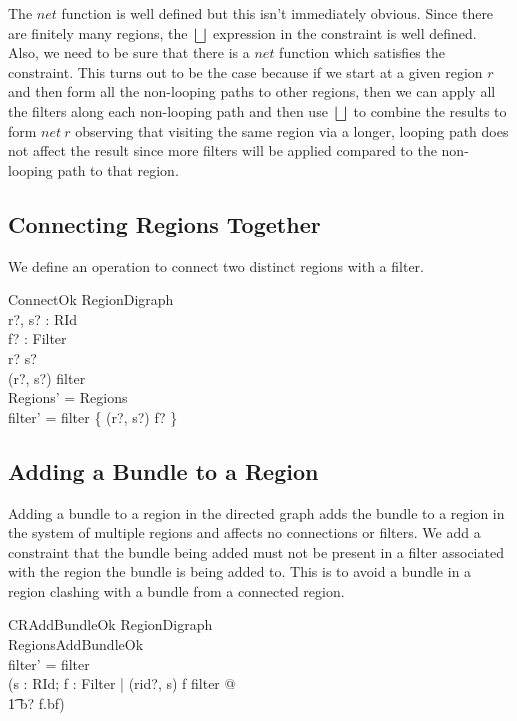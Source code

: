 \documentclass[a4paper,9pt]{article}
\begin{document}
The $net$ function is well defined but this isn't immediately obvious.
Since there are finitely many regions, the $\bigsqcup$ expression in the constraint is well defined.
Also, we need to be sure that there is a $net$ function which satisfies the constraint.
This turns out to be the case because if we start at a given region $r$ and then form all the non-looping
paths to other regions, then we can apply all the filters along each non-looping path and then
use $\bigsqcup$ to combine the results to form $net~r$ observing that visiting the same region via
a longer, looping path does not affect the result since more filters will
be applied compared to the non-looping path to that region.

\subsection{Connecting Regions Together}

We define an operation to connect two distinct regions with a filter.
\begin{schema}{ConnectOk}
  \Delta RegionDigraph \\
  r?, s? : RId \\
  f? : Filter \\
\where
  r? \neq s? \\
  (r?, s?) \notin \dom filter \\
  \theta Regions' = \theta Regions \\
  filter' = filter \cup \{ (r?, s?) \mapsto f? \} \\
\end{schema}

\subsection{Adding a Bundle to a Region}

Adding a bundle to a region in the directed graph adds the bundle to a region in the
system of multiple regions and affects no connections or filters.
We add a constraint that the bundle being added must not 
be present in a filter associated with the region the bundle is being added to.
This is to avoid a bundle in a region clashing with a bundle from a connected region.
\begin{schema}{CRAddBundleOk}
  \Delta RegionDigraph \\
  RegionsAddBundleOk \\
\where
  filter' = filter \\
  (\forall s : RId; f : Filter | (rid?, s) \mapsto f \in filter @ \\
\t1 b? \notin f.bf) \\ 
\end{schema}
\end{document}
